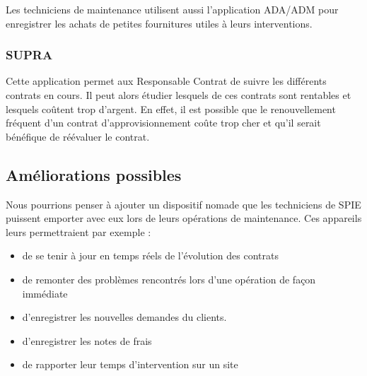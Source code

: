 Les techniciens de maintenance utilisent aussi l'application ADA/ADM pour enregistrer les achats de petites fournitures utiles à leurs interventions.

\subsubsection{SUPRA}

Cette application permet aux Responsable Contrat de suivre les différents contrats en cours.
Il peut alors étudier lesquels de ces contrats sont rentables et lesquels coûtent trop d'argent.
En effet, il est possible que le renouvellement fréquent d'un contrat d'approvisionnement coûte trop cher et qu'il serait bénéfique de réévaluer le contrat.

\subsection{Améliorations possibles}

Nous pourrions penser à ajouter un dispositif nomade que les techniciens de SPIE puissent emporter avec eux lors de leurs opérations de maintenance.
Ces appareils leurs permettraient par exemple :

\begin{itemize}
\item de se tenir à jour en temps réels de l'évolution des contrats
\item de remonter des problèmes rencontrés lors d'une opération de façon immédiate
\item d'enregistrer les nouvelles demandes du clients.
\item d'enregistrer les notes de frais
\item de rapporter leur temps d'intervention sur un site
\end{itemize}

